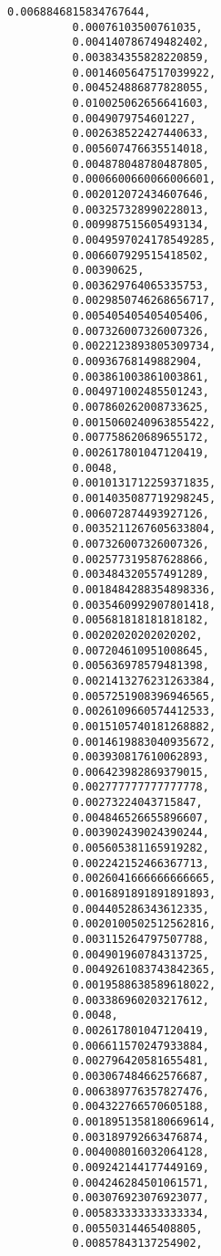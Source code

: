 \documentclass[11pt]{article}
\begin{document}
\begin{Verbatim}[commandchars=\\\{\}]
          0.0068846815834767644,
          0.00076103500761035,
          0.004140786749482402,
          0.003834355828220859,
          0.0014605647517039922,
          0.004524886877828055,
          0.010025062656641603,
          0.0049079754601227,
          0.002638522427440633,
          0.005607476635514018,
          0.004878048780487805,
          0.0006600660066006601,
          0.002012072434607646,
          0.003257328990228013,
          0.009987515605493134,
          0.0049597024178549285,
          0.006607929515418502,
          0.00390625,
          0.003629764065335753,
          0.0029850746268656717,
          0.005405405405405406,
          0.007326007326007326,
          0.0022123893805309734,
          0.00936768149882904,
          0.003861003861003861,
          0.004971002485501243,
          0.007860262008733625,
          0.0015060240963855422,
          0.007758620689655172,
          0.002617801047120419,
          0.0048,
          0.0010131712259371835,
          0.0014035087719298245,
          0.006072874493927126,
          0.0035211267605633804,
          0.007326007326007326,
          0.002577319587628866,
          0.003484320557491289,
          0.0018484288354898336,
          0.0035460992907801418,
          0.005681818181818182,
          0.00202020202020202,
          0.007204610951008645,
          0.005636978579481398,
          0.0021413276231263384,
          0.0057251908396946565,
          0.0026109660574412533,
          0.0015105740181268882,
          0.0014619883040935672,
          0.003930817610062893,
          0.006423982869379015,
          0.002777777777777778,
          0.00273224043715847,
          0.004846526655896607,
          0.003902439024390244,
          0.005605381165919282,
          0.002242152466367713,
          0.0026041666666666665,
          0.0016891891891891893,
          0.004405286343612335,
          0.0020100502512562816,
          0.003115264797507788,
          0.004901960784313725,
          0.0049261083743842365,
          0.0019588638589618022,
          0.003386960203217612,
          0.0048,
          0.002617801047120419,
          0.006611570247933884,
          0.002796420581655481,
          0.003067484662576687,
          0.006389776357827476,
          0.004322766570605188,
          0.0018951358180669614,
          0.003189792663476874,
          0.004008016032064128,
          0.009242144177449169,
          0.004246284501061571,
          0.003076923076923077,
          0.005833333333333334,
          0.00550314465408805,
          0.00857843137254902,

\end{Verbatim}
\end{document}
